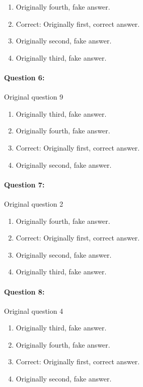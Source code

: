 \documentclass[9pt, twoside, twocolumn]{extarticle}
\begin{document}
\begin{enumerate}[label=\textbf{{\Alph*}},labelindent=0pt, labelsep=1.5em, parsep=0.2em]
\item Originally fourth, fake answer.
\item Correct: Originally first, correct answer.
\item Originally second, fake answer.
\item Originally third, fake answer.
\end{enumerate}
\paragraph{Question 6:}
Original question 9

\begin{enumerate}[label=\textbf{{\Alph*}},labelindent=0pt, labelsep=1.5em, parsep=0.2em]
\item Originally third, fake answer.
\item Originally fourth, fake answer.
\item Correct: Originally first, correct answer.
\item Originally second, fake answer.
\end{enumerate}
\paragraph{Question 7:}
Original question 2

\begin{enumerate}[label=\textbf{{\Alph*}},labelindent=0pt, labelsep=1.5em, parsep=0.2em]
\item Originally fourth, fake answer.
\item Correct: Originally first, correct answer.
\item Originally second, fake answer.
\item Originally third, fake answer.
\end{enumerate}
\paragraph{Question 8:}
Original question 4

\begin{enumerate}[label=\textbf{{\Alph*}},labelindent=0pt, labelsep=1.5em, parsep=0.2em]
\item Originally third, fake answer.
\item Originally fourth, fake answer.
\item Correct: Originally first, correct answer.
\item Originally second, fake answer.
\end{enumerate}
\end{document}
